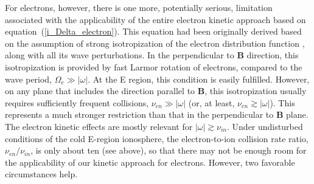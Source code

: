 \documentclass[draft]{agujournal2019}
\renewcommand{\vec}{\mathbf}
\begin{document}
{For electrons, however, there is one more, potentially serious, limitation associated
with the applicability of the entire electron kinetic approach based on
equation~(\ref{i_Delta_electron}). This equation had been originally derived
based on the assumption of strong isotropization of the electron distribution
function \cite{Gurevich:Nonlinear78,Dimant:Kinetic95a}, along with all its
wave perturbations. In the perpendicular to $\vec{B}$ direction, this
isotropization is provided by fast Larmor rotation of electrons, compared to
the wave period, $\Omega_{e}\gg|\omega|$. At the E region, this condition is
easily fulfilled. However, on any plane that includes the
direction parallel to $\vec{B}$, this isotropization usually requires
sufficiently frequent collisions, $\nu_{en}\gg|\omega|$ (or, at least, 
$\nu_{en}\gtrsim|\omega|$). This represents a much stronger
restriction than that in the perpendicular to $\vec{B}$ plane. The electron
kinetic effects are mostly relevant for $|\omega|\gtrsim\nu_{in}$. Under
undisturbed conditions of the cold E-region ionosphere, the electron-to-ion
collision rate ratio, $\nu_{en}/\nu_{in}$, is only about ten (see above), so that
there may not be enough room for the applicability of our kinetic approach for
electrons. However, two favorable circumstances help.

}
\end{document}
